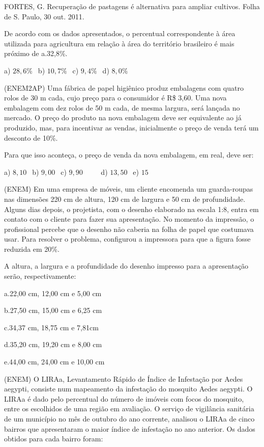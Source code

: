 \begin{multicols*}{2}
		      FORTES, G. Recuperação de pastagens é alternativa para ampliar cultivos. Folha de S. Paulo, 30 out. 2011.

		      De acordo com os dados apresentados, o percentual correspondente à área utilizada para agricultura em relação à área do território brasileiro é mais próximo de a.32,8\%.

		      a) $28,6\% \ \ $ b) $10,7\% \ \ $ c) $ 9,4\% \ \ $ d) $ 8,0\% $

		\execnum (ENEM2AP) Uma fábrica de papel higiênico produz embalagens com quatro rolos de 30 m cada, cujo preço
		      para o consumidor é R\$ 3,60. Uma nova embalagem com dez rolos de 50 m cada, de mesma largura, será lançada no
		      mercado. O preço do produto na nova embalagem deve ser equivalente ao já produzido, mas, para incentivar as
		      vendas, inicialmente o preço de venda terá um desconto de 10\%.

		      Para que isso aconteça, o preço de venda da nova embalagem, em real, deve ser:

		      a) $8,10 \ \ $ b) $9,00 \ \ $ c) $9,90 \ \ \ \ \ \ \ \ \ \ $ d) $13,50 \ \ $ e) $15 \ \ $

		\execnum (ENEM) Em uma empresa de móveis, um cliente encomenda um guarda-roupas nas dimensões 220 cm de
		      altura, 120 cm de largura e 50 cm de profundidade. Alguns dias depois, o projetista, com o desenho elaborado na
		      escala 1:8, entra em contato com o cliente para fazer sua apresentação. No momento da impressão, o profissional
		      percebe que o desenho não caberia na folha de papel que costumava usar. Para resolver o problema, configurou a
		      impressora para que a figura fosse reduzida em 20\%.

		      A altura, a largura e a profundidade do desenho impresso para a apresentação serão, respectivamente:

		      a.22,00 cm, 12,00 cm e 5,00 cm

		      b.27,50 cm, 15,00 cm e 6,25 cm

		      c.34,37 cm, 18,75 cm e 7,81cm

		      d.35,20 cm, 19,20 cm e 8,00 cm

		      e.44,00 cm, 24,00 cm e 10,00 cm

		\execnum (ENEM) O LIRAa, Levantamento Rápido de Índice de Infestação por Aedes aegypti, consiste num mapeamento da infestação do mosquito Aedes aegypti. O LIRAa é dado pelo percentual do número de imóveis com focos do mosquito, entre os escolhidos de uma região em avaliação. O serviço de vigilância sanitária de um município no mês de outubro do ano corrente, analisou o LIRAa de cinco bairros que apresentaram o maior índice de infestação no ano anterior. Os dados obtidos para cada bairro foram:


\end{multicols*}
